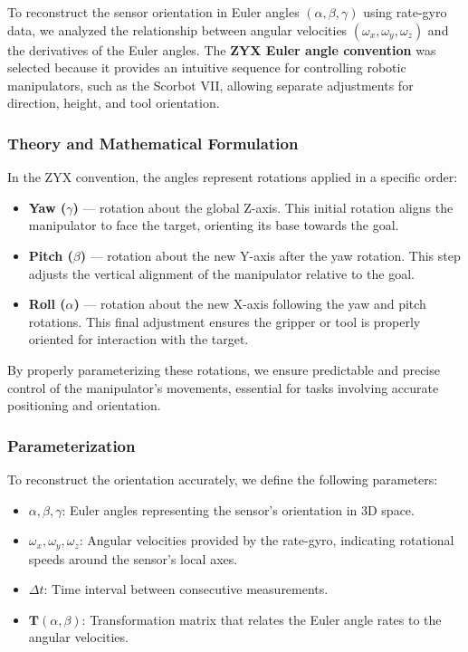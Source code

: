 \documentclass[12pt]{article}
\begin{document}
To reconstruct the sensor orientation in Euler angles \((\alpha, \beta, \gamma)\) using rate-gyro data, we analyzed the relationship between angular velocities \((\omega_x, \omega_y, \omega_z)\) and the derivatives of the Euler angles. The \textbf{ZYX Euler angle convention} was selected because it provides an intuitive sequence for controlling robotic manipulators, such as the Scorbot VII, allowing separate adjustments for direction, height, and tool orientation.

\subsubsection{Theory and Mathematical Formulation}

In the ZYX convention, the angles represent rotations applied in a specific order:
\begin{itemize}
    \item \textbf{Yaw (\(\gamma\))} — rotation about the global Z-axis. This initial rotation aligns the manipulator to face the target, orienting its base towards the goal.
    \item \textbf{Pitch (\(\beta\))} — rotation about the new Y-axis after the yaw rotation. This step adjusts the vertical alignment of the manipulator relative to the goal.
    \item \textbf{Roll (\(\alpha\))} — rotation about the new X-axis following the yaw and pitch rotations. This final adjustment ensures the gripper or tool is properly oriented for interaction with the target.
\end{itemize}

By properly parameterizing these rotations, we ensure predictable and precise control of the manipulator's movements, essential for tasks involving accurate positioning and orientation.

\subsubsection{Parameterization}
To reconstruct the orientation accurately, we define the following parameters:
\begin{itemize}
    \item \(\alpha, \beta, \gamma\): Euler angles representing the sensor's orientation in 3D space.
    \item \(\omega_x, \omega_y, \omega_z\): Angular velocities provided by the rate-gyro, indicating rotational speeds around the sensor’s local axes.
    \item \(\Delta t\): Time interval between consecutive measurements.
    \item \(\mathbf{T}(\alpha, \beta)\): Transformation matrix that relates the Euler angle rates to the angular velocities.
\end{itemize}
\end{document}
